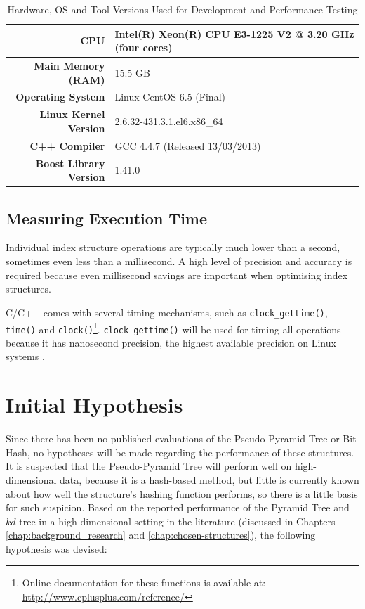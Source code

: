 \begin{table}
	\centering
	\begin{tabular}{|r|l|}
		\hline
		\textbf{CPU} & Intel(R) Xeon(R) CPU E3-1225 V2 @ 3.20 GHz (four cores) \\
		\hline
		\textbf{Main Memory (RAM)} & 15.5 GB \\
		\hline
		\textbf{Operating System} & Linux CentOS 6.5 (Final) \\
		\hline
		\textbf{Linux Kernel Version} & 2.6.32-431.3.1.el6.x86\_64 \\
		\hline
		\textbf{C++ Compiler} & GCC 4.4.7 (Released 13/03/2013) \\
		\hline
		\textbf{Boost Library Version} & 1.41.0 \\
		\hline
	\end{tabular}
	\caption{Hardware, OS and Tool Versions Used for Development and Performance Testing}
	\label{tab:system-specifications}
\end{table}

\subsection{Measuring Execution Time}

Individual index structure operations are typically much lower than a second, sometimes even less than a millisecond. A high level of precision and accuracy is required because even millisecond savings are important when optimising index structures.

C/C++ comes with several timing mechanisms, such as \texttt{clock\_gettime()}, \texttt{time()} and \texttt{clock()}\footnote{Online documentation for these functions is available at: \url{http://www.cplusplus.com/reference/}}. \texttt{clock\_gettime()} will be used for timing all operations because it has nanosecond precision, the highest available precision on Linux systems \cite{clockgettime-fastest1,clockgettime-fastest2}.

\section{Initial Hypothesis}
\label{sec:initial-hypothesis}

Since there has been no published evaluations of the Pseudo-Pyramid Tree or Bit Hash, no hypotheses will be made regarding the performance of these structures. It is suspected that the Pseudo-Pyramid Tree will perform well on high-dimensional data, because it is a hash-based method, but little is currently known about how well the structure's hashing function performs, so there is a little basis for such suspicion. Based on the reported performance of the Pyramid Tree and $kd$-tree in a high-dimensional setting in the literature (discussed in Chapters \ref{chap:background_research} and \ref{chap:chosen-structures}), the following hypothesis was devised:

